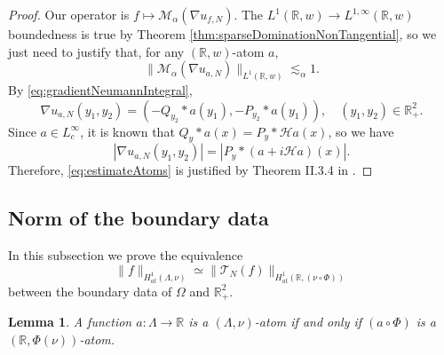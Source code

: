 \documentclass[12pt]{amsart}
\newcommand{\R}{\mathbb{R}}
\theoremstyle{plain}
\newtheorem{lemma}[theorem]{Lemma}
\theoremstyle{definition}
\numberwithin{equation}{section}
\begin{document}
\begin{proof}
    Our operator is $f\mapsto \mathcal{M}_{\alpha}(\nabla u_{f,N})$. The $L^1(\R,w)\to L^{1,\infty}(\R,w)$ boundedness is true by Theorem \ref{thm:sparseDominationNonTangential}, so we just need to justify that, for any $(\R,w)$-atom $a$,
    \begin{equation}\label{eq:estimateAtoms}
        \|\mathcal{M}_{\alpha}(\nabla u_{a,N})\|_{L^1(\R,w)}\lesssim_{\alpha} 1.
    \end{equation}
    By \eqref{eq:gradientNeumannIntegral},
    \[
    \nabla u_{a,N}(y_1,y_2)
    =
    (-Q_{y_2}\ast a(y_1),-P_{y_2}\ast a(y_1)),
    \quad (y_1,y_2)\in \R_{+}^{2}.
    \]
    Since $a\in L_{c}^{\infty}$, it is known that $Q_{y}\ast a(x)=P_{y}\ast \mathcal{H}a(x)$, so we have
    \[
    |\nabla u_{a,N}(y_1,y_2)|
    = 
    |P_y\ast (a+i\mathcal{H}a)(x)|.
    \]
    Therefore, \eqref{eq:estimateAtoms} is justified by Theorem II.3.4 in
    \cite{GarciaCuerva}.  \qedhere
\end{proof}



\subsection{Norm of the boundary data}\label{section:H1normNeumannDatum}

In this subsection we prove the equivalence
\begin{equation}\label{eq:equivalenciaDatoH1}
    \|f\|_{H_{at}^{1}(\Lambda,\nu)}
    \simeq
    \|\mathcal{T}_{N}(f)\|_{H_{at}^{1}(\R,(\nu\circ\Phi))}
\end{equation}
between the boundary data of $\Omega$ and $\R_{+}^{2}$. 

\begin{lemma}\label{lemma:atomEquivalence1}
    A function $a\colon\Lambda\to\R$ is a $(\Lambda, \nu)$-atom if and only if $(a\circ\Phi)$ is a $(\R,\Phi(\nu))$-atom.
\end{lemma}
\end{document}
